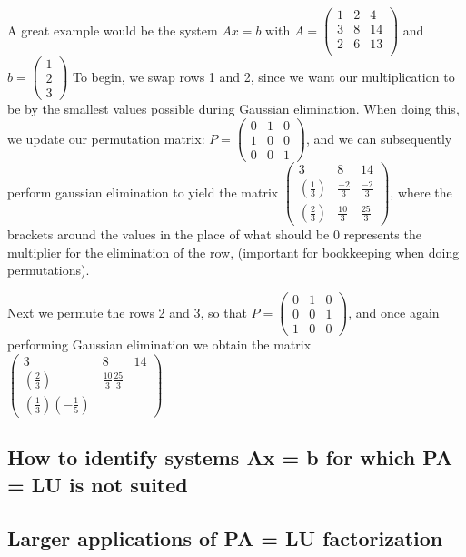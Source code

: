 \documentclass[11pt]{article}
\begin{document}
A great example would be the system $Ax = b$  with $A = \begin{pmatrix}1 & 2 & 4\\3 & 8 & 14\\ 2 & 6 & 13\\
\end{pmatrix}$ and $b = \begin{pmatrix}1\\2\\3
\end{pmatrix}$
To begin, we swap rows 1 and 2, since we want our multiplication to be by the smallest values possible during Gaussian elimination.
When doing this, we update our permutation matrix: $P = \begin{pmatrix}0&1&0\\1&0&0\\0&0&1
\end{pmatrix}$, and we can subsequently perform gaussian elimination to yield the matrix $\begin{pmatrix}3&8&14\\(\frac{1}{3})&\frac{-2}{3}&\frac{-2}{3}\\(\frac{2}{3})&\frac{10}{3}&\frac{25}{3}
\end{pmatrix}$, where the brackets around the values in the place of what should be $0$ represents the multiplier for the elimination of the row, (important for bookkeeping when doing permutations).

Next we permute the rows 2 and 3, so that $P = \begin{pmatrix}0&1&0\\0&0&1\\1&0&0
\end{pmatrix}$, and once again performing Gaussian elimination we obtain the matrix $\begin{pmatrix}3&8&14\\(\frac{2}{3})&\frac{10}{3}\frac{25}{3}\\(\frac{1}{3})(-\frac{1}{5})\frac{}{}
\end{pmatrix}$


\subsection{How to identify systems Ax = b for which PA = LU is not suited}

\subsection{Larger applications of PA = LU factorization}
\end{document}
